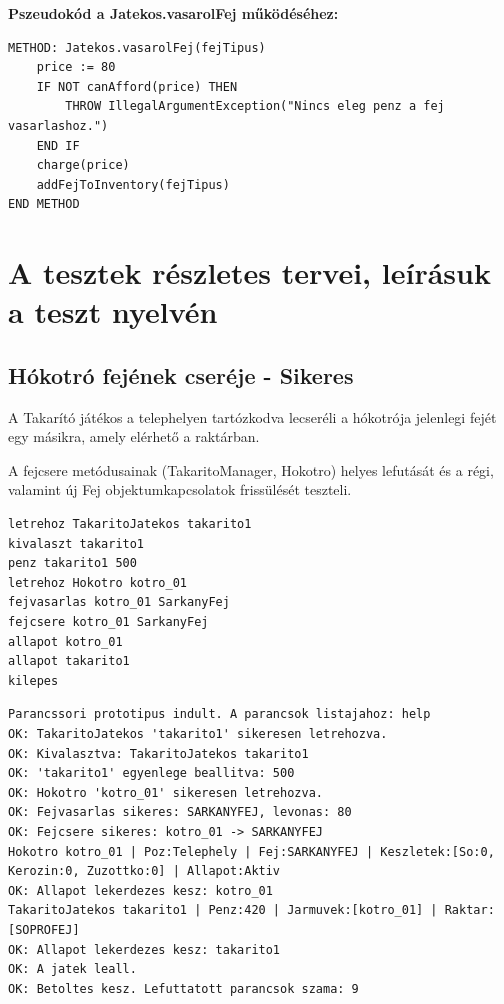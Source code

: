 \textbf{Pszeudokód a Jatekos.vasarolFej működéséhez:}
\begin{verbatim}
METHOD: Jatekos.vasarolFej(fejTipus)
    price := 80
    IF NOT canAfford(price) THEN
        THROW IllegalArgumentException("Nincs eleg penz a fej vasarlashoz.")
    END IF
    charge(price)
    addFejToInventory(fejTipus)
END METHOD
\end{verbatim}

\section{A tesztek részletes tervei, leírásuk a teszt nyelvén}

\subsection{Hókotró fejének cseréje - Sikeres}
\begin{test-case-description}
    A Takarító játékos a telephelyen tartózkodva lecseréli a hókotrója jelenlegi fejét egy másikra, amely elérhető a raktárban.
\end{test-case-description}
\begin{test-case-function}
    A fejcsere metódusainak (TakaritoManager, Hokotro) helyes lefutását és a régi, valamint új Fej objektumkapcsolatok frissülését teszteli.
\end{test-case-function}
\begin{test-case-input}
\begin{verbatim}
letrehoz TakaritoJatekos takarito1
kivalaszt takarito1
penz takarito1 500
letrehoz Hokotro kotro_01
fejvasarlas kotro_01 SarkanyFej
fejcsere kotro_01 SarkanyFej
allapot kotro_01
allapot takarito1
kilepes
\end{verbatim}
\end{test-case-input}
\begin{test-case-output}
\begin{verbatim}
Parancssori prototipus indult. A parancsok listajahoz: help
OK: TakaritoJatekos 'takarito1' sikeresen letrehozva.
OK: Kivalasztva: TakaritoJatekos takarito1
OK: 'takarito1' egyenlege beallitva: 500
OK: Hokotro 'kotro_01' sikeresen letrehozva.
OK: Fejvasarlas sikeres: SARKANYFEJ, levonas: 80
OK: Fejcsere sikeres: kotro_01 -> SARKANYFEJ
Hokotro kotro_01 | Poz:Telephely | Fej:SARKANYFEJ | Keszletek:[So:0, Kerozin:0, Zuzottko:0] | Allapot:Aktiv
OK: Allapot lekerdezes kesz: kotro_01
TakaritoJatekos takarito1 | Penz:420 | Jarmuvek:[kotro_01] | Raktar:[SOPROFEJ]
OK: Allapot lekerdezes kesz: takarito1
OK: A jatek leall.
OK: Betoltes kesz. Lefuttatott parancsok szama: 9
\end{verbatim}
\end{test-case-output}

